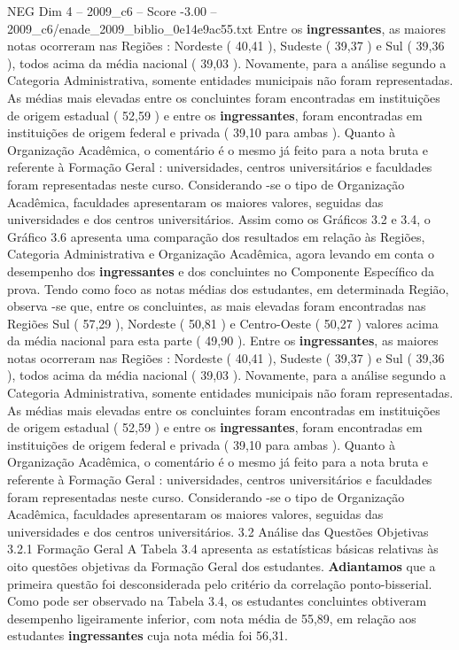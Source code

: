 \begin{textsample}{NEG Dim 4 – 2009\_c6 – Score -3.00 – 2009\_c6/enade\_2009\_biblio\_0e14e9ac55.txt}
Entre os \textbf{ingressantes}, as maiores notas ocorreram nas Regiões : Nordeste ( 40,41 ), Sudeste ( 39,37 ) e Sul ( 39,36 ), todos acima da média nacional ( 39,03 ).
Novamente, para a análise segundo a Categoria Administrativa, somente entidades municipais não foram representadas.
As médias mais elevadas entre os concluintes foram encontradas em instituições de origem estadual ( 52,59 ) e entre os \textbf{ingressantes}, foram encontradas em instituições de origem federal e privada ( 39,10 para ambas ).
Quanto à Organização Acadêmica, o comentário é o mesmo já feito para a nota bruta e referente à Formação Geral : universidades, centros universitários e faculdades foram representadas neste curso.
Considerando -se o tipo de Organização Acadêmica, faculdades apresentaram os maiores valores, seguidas das universidades e dos centros universitários.
Assim como os Gráficos 3.2 e 3.4, o Gráfico 3.6 apresenta uma comparação dos resultados em relação às Regiões, Categoria Administrativa e Organização Acadêmica, agora levando em conta o desempenho dos \textbf{ingressantes} e dos concluintes no Componente Específico da prova.
Tendo como foco as notas médias dos estudantes, em determinada Região, observa -se que, entre os concluintes, as mais elevadas foram encontradas nas Regiões Sul ( 57,29 ), Nordeste ( 50,81 ) e Centro-Oeste ( 50,27 ) valores acima da média nacional para esta parte ( 49,90 ).
Entre os \textbf{ingressantes}, as maiores notas ocorreram nas Regiões : Nordeste ( 40,41 ), Sudeste ( 39,37 ) e Sul ( 39,36 ), todos acima da média nacional ( 39,03 ).
Novamente, para a análise segundo a Categoria Administrativa, somente entidades municipais não foram representadas.
As médias mais elevadas entre os concluintes foram encontradas em instituições de origem estadual ( 52,59 ) e entre os \textbf{ingressantes}, foram encontradas em instituições de origem federal e privada ( 39,10 para ambas ).
Quanto à Organização Acadêmica, o comentário é o mesmo já feito para a nota bruta e referente à Formação Geral : universidades, centros universitários e faculdades foram representadas neste curso.
Considerando -se o tipo de Organização Acadêmica, faculdades apresentaram os maiores valores, seguidas das universidades e dos centros universitários. 3.2 Análise das Questões Objetivas 3.2.1 Formação Geral A Tabela 3.4 apresenta as estatísticas básicas relativas às oito questões objetivas da Formação Geral dos estudantes. \textbf{Adiantamos} que a primeira questão foi desconsiderada pelo critério da correlação ponto-bisserial.
Como pode ser observado na Tabela 3.4, os estudantes concluintes obtiveram desempenho ligeiramente inferior, com nota média de 55,89, em relação aos estudantes \textbf{ingressantes} cuja nota média foi 56,31.

\end{textsample}
